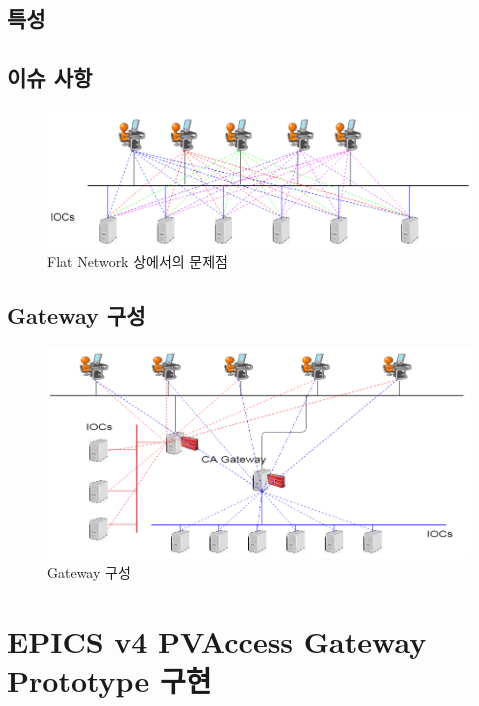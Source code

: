 \documentclass[11pt
  , a4paper
  , article
  , oneside
]{memoir}
\begin{document}
\section{특성}

\section{이슈 사항}

\begin{figure}[!htb]
	\centering
	\includegraphics[width=1\textwidth]{./images/flat_network.png}
	\caption{
		Flat Network 상에서의 문제점
	}
	\label{fig:flat_network}   
\end{figure}

\section{Gateway 구성}
\begin{figure}[!htb]
	\centering
	\includegraphics[width=1\textwidth]{./images/gateway.png}
	\caption{
		Gateway 구성
	}
	\label{fig:gateway}   
\end{figure}
\hfil\break

\chapter{EPICS v4 PVAccess Gateway Prototype 구현}
\end{document}

